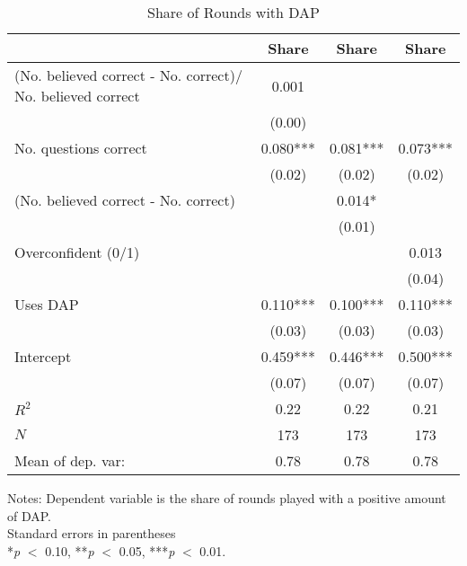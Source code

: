 \begin{table}[htbp]
\centering
\hspace*{-1.2cm}
\begin{threeparttable}
\caption{Share of Rounds with DAP}
\label{tab:D1dap}
\begin{tabular}{l ccc}
\hline
\hline
                    &       Share   &       Share   &       Share   \\
\hline
(No. believed correct - No. correct)/ No. believed correct&       0.001   &               &               \\
                    &      (0.00)   &               &               \\
No. questions correct&       0.080***&       0.081***&       0.073***\\
                    &      (0.02)   &      (0.02)   &      (0.02)   \\
(No. believed correct - No. correct)&               &       0.014*  &               \\
                    &               &      (0.01)   &               \\
Overconfident (0/1) &               &               &       0.013   \\
                    &               &               &      (0.04)   \\
Uses DAP            &       0.110***&       0.100***&       0.110***\\
                    &      (0.03)   &      (0.03)   &      (0.03)   \\
Intercept           &       0.459***&       0.446***&       0.500***\\
                    &      (0.07)   &      (0.07)   &      (0.07)   \\
\hline
$R^2$               &        0.22   &        0.22   &        0.21   \\
$N$                 &         173   &         173   &         173   \\
Mean of dep. var:   &        0.78   &        0.78   &        0.78   \\
\hline
\hline
\end{tabular}
\begin{tablenotes}
\footnotesize
\item{Notes: Dependent variable is the share of rounds played with a positive amount of DAP. \\ Standard errors in parentheses \\ *\textit{p} $<$ 0.10, **\textit{p} $<$ 0.05, ***\textit{p} $<$ 0.01.}
\end{tablenotes}
\end{threeparttable}
\end{table}
